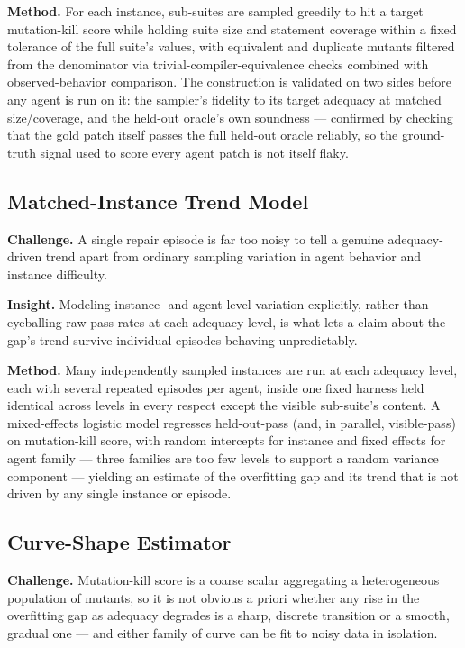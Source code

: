 \documentclass[11pt]{article}
\begin{document}
\textbf{Method.} For each instance, sub-suites are sampled greedily to hit a target mutation-kill score while holding suite size and statement coverage within a fixed tolerance of the full suite's values, with equivalent and duplicate mutants filtered from the denominator via trivial-compiler-equivalence checks combined with observed-behavior comparison. The construction is validated on two sides before any agent is run on it: the sampler's fidelity to its target adequacy at matched size/coverage, and the held-out oracle's own soundness --- confirmed by checking that the gold patch itself passes the full held-out oracle reliably, so the ground-truth signal used to score every agent patch is not itself flaky.

\subsection{Matched-Instance Trend Model}
\textbf{Challenge.} A single repair episode is far too noisy to tell a genuine adequacy-driven trend apart from ordinary sampling variation in agent behavior and instance difficulty.

\textbf{Insight.} Modeling instance- and agent-level variation explicitly, rather than eyeballing raw pass rates at each adequacy level, is what lets a claim about the gap's trend survive individual episodes behaving unpredictably.

\textbf{Method.} Many independently sampled instances are run at each adequacy level, each with several repeated episodes per agent, inside one fixed harness held identical across levels in every respect except the visible sub-suite's content. A mixed-effects logistic model regresses held-out-pass (and, in parallel, visible-pass) on mutation-kill score, with random intercepts for instance and fixed effects for agent family --- three families are too few levels to support a random variance component --- yielding an estimate of the overfitting gap and its trend that is not driven by any single instance or episode.

\subsection{Curve-Shape Estimator}
\textbf{Challenge.} Mutation-kill score is a coarse scalar aggregating a heterogeneous population of mutants, so it is not obvious a priori whether any rise in the overfitting gap as adequacy degrades is a sharp, discrete transition or a smooth, gradual one --- and either family of curve can be fit to noisy data in isolation.
\end{document}

